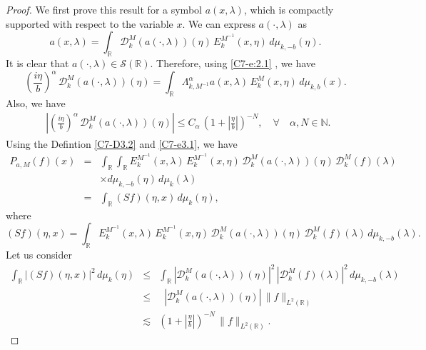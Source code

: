 \documentclass[10pt,a4paper]{amsart}
\begin{document}
\begin{proof}
We first prove this result for a symbol $a(x,\lambda)$, which is compactly supported with respect to the variable $x$. We can express $a(\cdot,\lambda)$ as
\begin{equation} \label{C7-e3.1}
 a(x,\lambda) = \int_{\mathbb{R}} \mathcal{D}_k^M(a(\cdot, \lambda))(\eta)\, E_k^{M^{-1}}(x,\eta)\, d\mu_{k,-b}(\eta).
\end{equation}
It is clear that  $a(\cdot, \lambda) \in \mathcal{S}(\mathbb{R})$. Therefore, using \eqref{C7-e:2.1} , we have 
\begin{equation*}
    \left(\frac{i\eta}{b}\right)^\alpha\, \mathcal{D}_k^M(a(\cdot, \lambda))(\eta) = \int_{\mathbb{R}} \Lambda^\alpha_{k,M^{-1}} a(x,\lambda)\,E_k^M(x,\eta)\,d\mu_{k,b}(x).
\end{equation*}
Also, we have 
\begin{eqnarray*}
 \mathop{\underset{\eta
 \in \mathbb{R}}{\text{sup}}}  \left|  \left(\frac{i\eta}{b}\right)^\alpha\, \mathcal{D}_k^M(a(\cdot, \lambda))(\eta) \right| \le C_\alpha\,\left(1+ \left|\frac{\eta}{b} \right|\right)^{-N}, \quad \forall \quad 
\alpha,  N \in \mathbb{N}.
\end{eqnarray*}
Using the Defintion \ref{C7-D3.2} and \eqref{C7-e3.1}, we have 
\begin{eqnarray*}
    P_{a,M}(f)(x) &=& \int_{\mathbb{R}} \int_{\mathbb{R}} E_k^{M^{-1}}(x,\lambda)\,E_k^{M^{-1}}(x,\eta)\,\mathcal{D}_k^M(a(\cdot,\lambda))(\eta)\,\mathcal{D}_k^M(f)(\lambda)\,\\ &&\times d\mu_{k,-b}(\eta)\, d\mu_k(\lambda)\\
    &=&\int_{\mathbb{R}}  (Sf)(\eta,x)\,d\mu_k(\eta),
\end{eqnarray*}
where
\begin{equation*}
(Sf)(\eta,x) = \int_{\mathbb{R}} E_k^{M^{-1}}(x,\lambda)\,E_k^{M^{-1}}(x,\eta)\,\mathcal{D}_k^M(a(\cdot,\lambda))(\eta)\,\mathcal{D}_k^M(f)(\lambda)\,d\mu_{k,-b}(\lambda).
\end{equation*}
Let us consider
\begin{eqnarray*}
    \int_{\mathbb{R}} |(Sf)(\eta,x)|^2\,d\mu_k(\eta) &\le&\int_{\mathbb{R}} |\mathcal{D}_k^M(a(\cdot,\lambda))(\eta)|^2\,|\mathcal{D}_k^M(f)(\lambda)|^2\,d\mu_{k,-b}(\lambda)\\
    &\le&  \mathop{\underset{\eta
 \in \mathbb{R}}{\text{sup}}}|\mathcal{D}_k^M(a(\cdot,\lambda))(\eta)|\,\|f\|_{L^2(\mathbb{R})}\\
 &\lesssim& \left(1+ \left|\frac{\eta}{b} \right|\right)^{-N}\,\|f\|_{L^2(\mathbb{R})}.

\end{eqnarray*}
\end{proof}
\end{document}
